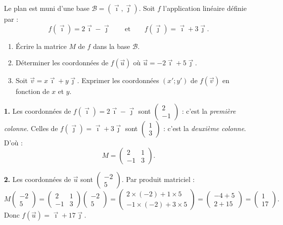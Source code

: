 \documentclass[11pt]{article}
\begin{document}
\begin{exoresolu}
Le plan est muni d'une base $\mathcal{B}=(\vec{\imath},\vec{\jmath})$. Soit $f$ l'application linéaire définie par :
\[ f(\vec{\imath})=2\vec{\imath}-\vec{\jmath} \qquad \text{et} \qquad f(\vec{\jmath})=\vec{\imath}+3\vec{\jmath}. \]
\begin{enumerate}
\item Écrire la matrice $M$ de $f$ dans la base $\mathcal{B}$.
\item Déterminer les coordonnées de $f(\vec{u})$ où $\vec{u}=-2\vec{\imath}+5\vec{\jmath}$.
\item Soit $\vec{v}=x\vec{\imath}+y\vec{\jmath}$. Exprimer les coordonnées $(x';y')$ de $f(\vec{v})$ en fonction de $x$ et $y$.
\end{enumerate}
\tcblower
\textbf{1.} Les coordonnées de $f(\vec{\imath})=2\vec{\imath}-\vec{\jmath}$ sont $\begin{pmatrix} 2 \\ -1 \end{pmatrix}$ : c'est la \emph{première colonne}. Celles de $f(\vec{\jmath})=\vec{\imath}+3\vec{\jmath}$ sont $\begin{pmatrix} 1 \\ 3 \end{pmatrix}$ : c'est la \emph{deuxième colonne}. D'où :
\[ M=\begin{pmatrix} 2 & 1 \\ -1 & 3 \end{pmatrix}. \]

\textbf{2.} Les coordonnées de $\vec{u}$ sont $\begin{pmatrix} -2 \\ 5 \end{pmatrix}$. Par produit matriciel :
\[ M\begin{pmatrix} -2 \\ 5 \end{pmatrix}=\begin{pmatrix} 2 & 1 \\ -1 & 3 \end{pmatrix}\begin{pmatrix} -2 \\ 5 \end{pmatrix}=\begin{pmatrix} 2\times(-2)+1\times 5 \\ -1\times(-2)+3\times 5 \end{pmatrix}=\begin{pmatrix} -4+5 \\ 2+15 \end{pmatrix}=\begin{pmatrix} 1 \\ 17 \end{pmatrix}. \]
Donc $f(\vec{u})=\vec{\imath}+17\vec{\jmath}$.


\end{exoresolu}
\end{document}
